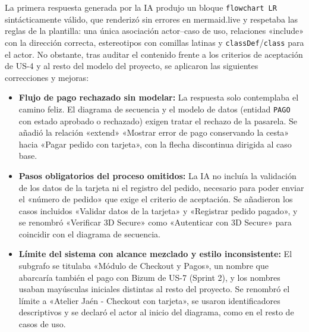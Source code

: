 La primera respuesta generada por la IA produjo un bloque \texttt{flowchart LR} sintácticamente válido, que renderizó sin errores en mermaid.live y respetaba las reglas de la plantilla: una única asociación actor--caso de uso, relaciones «include» con la dirección correcta, estereotipos con comillas latinas y \texttt{classDef}/\texttt{class} para el actor. No obstante, tras auditar el contenido frente a los criterios de aceptación de US-4 y al resto del modelo del proyecto, se aplicaron las siguientes correcciones y mejoras:
\begin{itemize}[leftmargin=*,nosep]
\item \textbf{Flujo de pago rechazado sin modelar:} La respuesta solo contemplaba el camino feliz. El diagrama de secuencia y el modelo de datos (entidad \texttt{PAGO} con estado aprobado o rechazado) exigen tratar el rechazo de la pasarela. Se añadió la relación «extend» «Mostrar error de pago conservando la cesta» hacia «Pagar pedido con tarjeta», con la flecha discontinua dirigida al caso base.
\item \textbf{Pasos obligatorios del proceso omitidos:} La IA no incluía la validación de los datos de la tarjeta ni el registro del pedido, necesario para poder enviar el «número de pedido» que exige el criterio de aceptación. Se añadieron los casos incluidos «Validar datos de la tarjeta» y «Registrar pedido pagado», y se renombró «Verificar 3D Secure» como «Autenticar con 3D Secure» para coincidir con el diagrama de secuencia.
\item \textbf{Límite del sistema con alcance mezclado y estilo inconsistente:} El subgrafo se titulaba «Módulo de Checkout y Pagos», un nombre que abarcaría también el pago con Bizum de US-7 (Sprint 2), y los nombres usaban mayúsculas iniciales distintas al resto del proyecto. Se renombró el límite a «Atelier Jaén - Checkout con tarjeta», se usaron identificadores descriptivos y se declaró el actor al inicio del diagrama, como en el resto de casos de uso.
\end{itemize}
